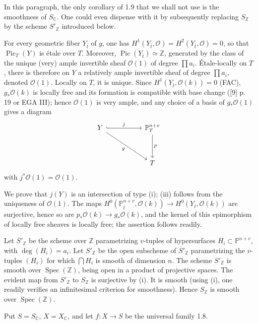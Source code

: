 \documentclass[10pt]{article}
\newcommand{\C}{\mathbb C}
\newcommand{\Pj}{\mathbb P}
\newcommand{\Z}{\mathbb Z}
\newcommand{\Spec}{\operatorname{Spec}}
\newcommand{\Pic}{\operatorname{Pic}}
\newcommand{\sourcebreak}{\clearpage}
\begin{document}
In this paragraph, the only corollary of 1.9 that we shall not use is the smoothness of \(S_\C\). One could even dispense with it by subsequently replacing \(S_\Z\) by the scheme \(S'_\Z\) introduced below.

For every geometric fiber \(Y_{\bar t}\) of \(g\), one has \(H^1(Y_{\bar t},\mathcal O)=H^2(Y_{\bar t},\mathcal O)=0\), so that \(\Pic_T(Y)\) is étale over \(T\). Moreover, \(\Pic(Y_{\bar t})\simeq\Z\), generated by the class of the unique (very) ample invertible sheaf \(\mathcal O(1)\) of degree \(\prod a_i\). Étale-locally on \(T\), there is therefore on \(Y\) a relatively ample invertible sheaf of degree \(\prod a_i\), denoted \(\mathcal O(1)\). Locally on \(T\), it is unique. Since \(H^1(Y_{\bar t},\mathcal O(k))=0\) (FAC), \(g_*\mathcal O(k)\) is locally free and its formation is compatible with base change ([9] p. 19 or EGA III); hence \(\mathcal O(1)\) is very ample, and any choice of a basis of \(g_*\mathcal O(1)\) gives a diagram
\[
\begin{tikzcd}[column sep=5.2em,row sep=3.4em]
Y \arrow[r,hook,"j"] \arrow[dr,"g"'] & \Pj_T^{n+v} \arrow[d,"p"]\\
& T
\end{tikzcd}
\]
with \(j^*\mathcal O(1)=\mathcal O(1)\).

We prove that \(j(Y)\) is an intersection of type (i); (iii) follows from the uniqueness of \(\mathcal O(1)\). The maps \(H^0(\Pj_{\bar t}^{n+v},\mathcal O(k))\to H^0(Y_{\bar t},\mathcal O(k))\) are surjective, hence so are \(p_*\mathcal O(k)\to g_*\mathcal O(k)\), and the kernel of this epimorphism of locally free sheaves is locally free; the assertion follows readily.

\sourcebreak
Let \(\overline{S}'_\Z\) be the scheme over \(\Z\) parametrizing \(v\)-tuples of hypersurfaces \(H_i\subset\Pj^{n+v}\), with \(\deg(H_i)=a_i\). Let \(S'_\Z\) be the open subscheme of \(\overline{S}'_\Z\) parametrizing the \(v\)-tuples \((H_i)\) for which \(\bigcap H_i\) is smooth of dimension \(n\). The scheme \(S'_\Z\) is smooth over \(\Spec(\Z)\), being open in a product of projective spaces. The evident map from \(S'_\Z\) to \(S_\Z\) is surjective by (i). It is smooth (using (i), one readily verifies an infinitesimal criterion for smoothness). Hence \(S_\Z\) is smooth over \(\Spec(\Z)\).

Put \(S=S_\C\), \(X=X_\C\), and let \(f:X\to S\) be the universal family 1.8.
\end{document}
